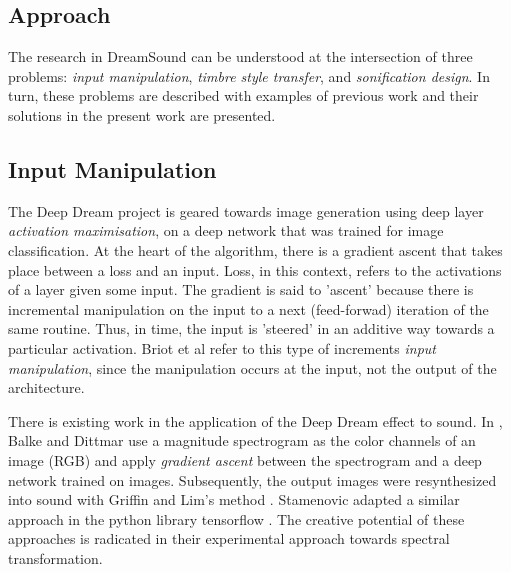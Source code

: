 \documentclass[a4paper,10pt,oneside]{article}
\begin{document}
\begin{sloppy}
\section{Approach}

The research in DreamSound can be understood at the intersection of three problems: \textit{input manipulation}, \textit{timbre style transfer}, and \textit{sonification design}. In turn, these problems are described with examples of previous work and their solutions in the present work are presented.

\subsection{Input Manipulation}
The Deep Dream project \cite{Mordvintsev2015} is geared towards image generation using deep layer \textit{activation maximisation}, on a deep network that was trained for image classification. At the heart of the algorithm, there is a gradient ascent that takes place between a loss and an input. Loss, in this context, refers to the activations of a layer given some input. The gradient is said to 'ascent' because there is incremental manipulation on the input to a next (feed-forwad) iteration of the same routine. Thus, in time, the input is 'steered' in an additive way towards a particular activation. Briot et al \cite{Briot2017} refer to this type of increments \textit{input manipulation}, since the manipulation occurs at the input, not the output of the architecture.

There is existing work in the application of the Deep Dream effect \cite{Mordvintsev2015} to sound. In \cite{Balke2015}, Balke and Dittmar use a magnitude spectrogram as the color channels of an image (RGB) and apply \textit{gradient ascent} between the spectrogram and a deep network trained on images. Subsequently, the output images were resynthesized into sound with Griffin and Lim's method \cite{Lim1983}. Stamenovic adapted a similar approach in the python library tensorflow \cite{Stamenovic2016}. The creative potential of these approaches is radicated in their experimental approach towards spectral transformation. 


\end{sloppy}
\end{document}
